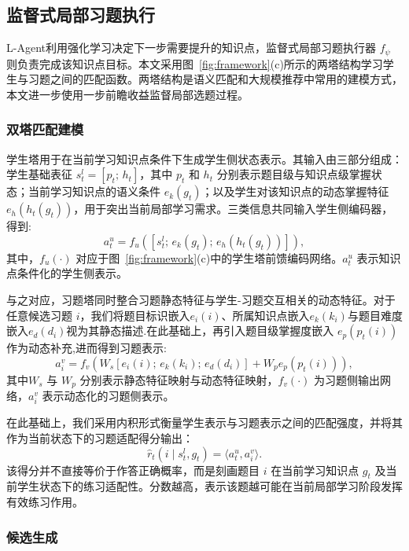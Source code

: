 \documentclass[UTF8,a4paper,zihao=5,twocolumn]{ctexart}
\begin{document}
\subsection{监督式局部习题执行}
L-Agent利用强化学习决定下一步需要提升的知识点，监督式局部习题执行器 $f_\psi$ 则负责完成该知识点目标。本文采用图~\ref{fig:framework}(c)所示的两塔结构学习学生与习题之间的匹配函数。两塔结构是语义匹配和大规模推荐中常用的建模方式\cite{HuaHG2013,CovAS2016,YiYH2019}，本文进一步使用一步前瞻收益监督局部选题过程。

\subsubsection{双塔匹配建模}

学生塔用于在当前学习知识点条件下生成学生侧状态表示。其输入由三部分组成：学生基础表征 $s_t^l=[p_t;\,h_t]$，其中 $p_t$ 和 $h_t$ 分别表示题目级与知识点级掌握状态；当前学习知识点的语义条件 $e_k(g_t)$；以及学生对该知识点的动态掌握特征 $e_h(h_t(g_t))$，用于突出当前局部学习需求。三类信息共同输入学生侧编码器，得到:
\begin{equation}
a_t^{u}
=
f_u\!\left([s_t^l;\,e_k(g_t);\,
e_h(h_t(g_t))]\right),
\end{equation}
其中，$f_u(\cdot)$ 对应于图~\ref{fig:framework}(c)中的学生塔前馈编码网络。$a_t^u$ 表示知识点条件化的学生侧表示。

与之对应，习题塔同时整合习题静态特征与学生-习题交互相关的动态特征。对于任意候选习题 $i$，我们将题目标识嵌入$e_i(i)$、所属知识点嵌入$e_k(k_i)$与题目难度嵌入$e_d(d_i)$视为其静态描述.在此基础上，再引入题目级掌握度嵌入 $e_p(p_t(i))$ 作为动态补充,进而得到习题表示:
\begin{equation}
a_i^{v}
=
f_v\!\left(
W_s[e_i(i);\,
e_k(k_i);\,
e_d(d_i)]
+
W_p e_p(p_t(i))
\right),
\end{equation}
其中$W_s$ 与 $W_p$ 分别表示静态特征映射与动态特征映射，$f_v(\cdot)$ 为习题侧输出网络，$a_i^v$ 表示动态化的习题侧表示。

在此基础上，我们采用内积形式衡量学生表示与习题表示之间的匹配强度，并将其作为当前状态下的习题适配得分输出：
\begin{equation}
\hat{r}_{t}(i\mid s_t^l,g_t)=\langle a_t^{u},a_i^{v}\rangle.
\end{equation}
该得分并不直接等价于作答正确概率，而是刻画题目 $i$ 在当前学习知识点 $g_t$ 及当前学生状态下的练习适配性。分数越高，表示该题越可能在当前局部学习阶段发挥有效练习作用。
\subsubsection{候选生成}
\end{document}
